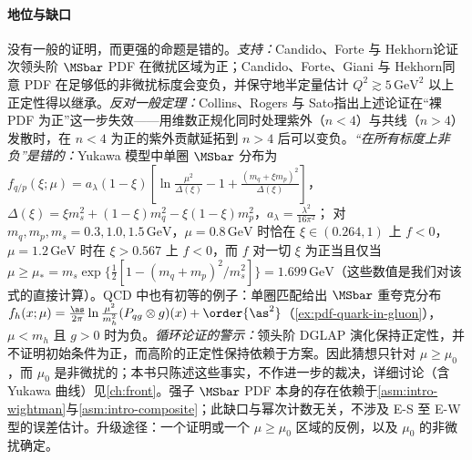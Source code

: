 \paragraph{地位与缺口}
没有一般的证明，而更强的命题是错的。\emph{支持：}Candido、Forte 与 Hekhorn\cite{CandidoForteHekhorn2020}论证次领头阶 $\MSbar$ PDF 在微扰区域为正；Candido、Forte、Giani 与 Hekhorn\cite{Candido:2023ujx}同意 PDF 在足够低的非微扰标度会变负，并保守地半定量估计 $Q^2\gtrsim5\,\mathrm{GeV}^2$ 以上正定性得以继承。\emph{反对一般定理：}Collins、Rogers 与 Sato\cite[第~VI~节]{CollinsRogersSato2022}指出上述论证在“裸 PDF 为正”这一步失效——用维数正规化同时处理紫外（$n<4$）与共线（$n>4$）发散时，在 $n<4$ 为正的紫外贡献延拓到 $n>4$ 后可以变负。\emph{“在所有标度上非负”是错的：}Yukawa 模型中单圈 $\MSbar$ 分布为 $f_{q/p}(\xi;\mu)=a_\lambda(1-\xi)[\ln\frac{\mu^2}{\Delta(\xi)}-1+\frac{(m_q+\xi m_p)^2}{\Delta(\xi)}]$，$\Delta(\xi)=\xi m_s^2+(1-\xi)m_q^2-\xi(1-\xi)m_p^2$，$a_\lambda=\frac{\lambda^2}{16\pi^2}$\cite[式~(55)]{CollinsRogersSato2022}；
对 $m_q,m_p,m_s=0.3,1.0,1.5\,\mathrm{GeV}$，$\mu=0.8\,\mathrm{GeV}$ 时恰在 $\xi\in(0.264,1)$ 上 $f<0$，$\mu=1.2\,\mathrm{GeV}$ 时在 $\xi>0.567$ 上 $f<0$，而 $f$ 对一切 $\xi$ 为正当且仅当 $\mu\ge\mu_*=m_s\exp\{\frac12[1-(m_q+m_p)^2/m_s^2]\}=1.699\,\mathrm{GeV}$（这些数值是我们对该式的直接计算）。QCD 中也有初等的例子：单圈匹配给出 $\MSbar$ 重夸克分布 $f_h(x;\mu)=\frac{\as}{2\pi}\ln\frac{\mu^2}{m_h^2}(P_{qg}\otimes g)(x)+\order{\as^2}$（\cref{ex:pdf-quark-in-gluon}），$\mu<m_h$ 且 $g>0$ 时为负。\emph{循环论证的警示：}领头阶 DGLAP 演化保持正定性，并不证明初始条件为正，而高阶的正定性保持依赖于方案。因此猜想只针对 $\mu\ge\mu_0$，而 $\mu_0$ 是非微扰的；本书只陈述这些事实，不作进一步的裁决，详细讨论（含 Yukawa 曲线）见\cref{ch:front}。强子 $\MSbar$ PDF 本身的存在依赖于\cref{asm:intro-wightman}与\cref{asm:intro-composite}；此缺口与幂次计数无关，不涉及 E-S 至 E-W 型的误差估计。升级途径：一个证明或一个 $\mu\ge\mu_0$ 区域的反例，以及 $\mu_0$ 的非微扰确定。
